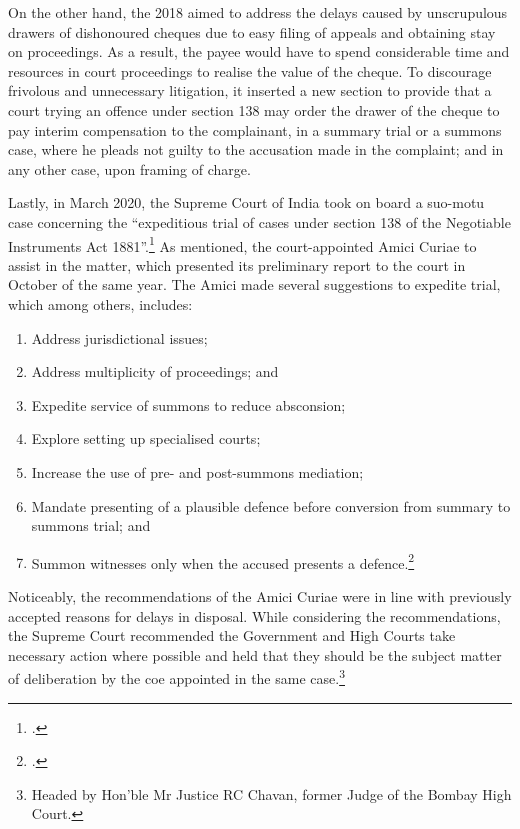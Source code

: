 \begin{enumerate}
\begin{enumerate}
On the other hand, the  2018 aimed to address the delays caused by unscrupulous drawers of dishonoured cheques due to easy filing of appeals and obtaining stay on proceedings. As a result, the payee would have to spend considerable time and resources in court proceedings to realise the value of the cheque. To discourage frivolous and unnecessary litigation, it inserted a new section to provide that a court trying an offence under section 138 may order the drawer of the cheque to pay interim compensation to the complainant, in a summary trial or a summons case, where he pleads not guilty to the accusation made in the complaint; and in any other case, upon framing of charge.

Lastly, in March 2020, the Supreme Court of India took on board a suo-motu case concerning the “expeditious trial of cases under section 138 of the Negotiable Instruments Act 1881”.\footcite{sc2020_138} As mentioned, the court-appointed Amici Curiae to assist in the matter, which presented its preliminary report to the court in October of the same year. The Amici made several suggestions to expedite trial, which among others, includes:

\begin{enumerate}[label=(\alph*)]
 \item Address jurisdictional issues;
 \item Address multiplicity of proceedings; and
 \item Expedite service of summons to reduce absconsion;
 \item Explore setting up specialised courts;
 \item Increase the use of pre- and post-summons mediation;
 \item Mandate presenting of a plausible defence before conversion from summary to summons trial; and
 \item Summon witnesses only when the accused presents a defence.\footcite{amicus2020_submission}
\end{enumerate}

Noticeably, the recommendations of the Amici Curiae were in line with previously accepted reasons for delays in disposal. While considering the recommendations, the Supreme Court recommended the Government and High Courts take necessary action where possible and held that they should be the subject matter of deliberation by the \gls{coe} appointed in the same case.\footnote{Headed by Hon’ble Mr Justice RC Chavan, former Judge of the Bombay High Court.}


\end{enumerate}
\end{enumerate}
